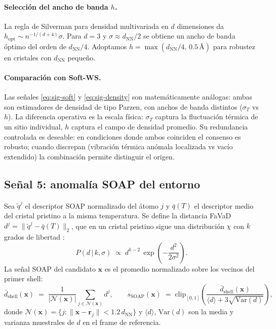 \documentclass[11pt,a4paper]{article}
\theoremstyle{remark}
\begin{document}
\paragraph{Selección del ancho de banda $h$.} La regla de Silverman
para densidad multivariada en $d$ dimensiones \cite{Silverman1986} da
$h_\text{opt} \sim n^{-1/(d+4)} \sigma$. Para $d=3$ y
$\sigma \approx d_\text{NN}/2$ se obtiene un ancho de banda óptimo del
orden de $d_\text{NN}/4$. Adoptamos
$h = \max(d_\text{NN}/4,\,0.5\,\text{Å})$ para robustez en cristales
con $d_\text{NN}$ pequeño.

\paragraph{Comparación con Soft-WS.} Las señales \ref{eq:sig-soft} y
\ref{eq:sig-density} son matemáticamente análogas: ambas son
estimadores de densidad de tipo Parzen, con anchos de banda distintos
($\sigma_T$ vs $h$). La diferencia operativa es la escala física:
$\sigma_T$ captura la fluctuación térmica de un sitio individual,
$h$ captura el campo de densidad promedio. Su redundancia controlada
es deseable: en condiciones donde ambos coinciden el consenso es
robusto; cuando discrepan (vibración térmica anómala localizada vs
vacío extendido) la combinación permite distinguir el origen.

\subsection{Señal 5: anomalía SOAP del entorno}
\label{sec:sig-soap}

Sea $\tilde q^j$ el descriptor SOAP normalizado del átomo $j$ y
$\bar q(T)$ el descriptor medio del cristal pristino a la misma
temperatura. Se define la distancia FaVaD
$d^j = \|\tilde q^j - \bar q(T)\|_2$, que en un cristal pristino sigue
una distribución $\chi$ con $k$ grados de libertad
\cite{Toussaint2020}:
\begin{equation}
  P(d \,|\, k,\sigma) \;\propto\; d^{k-2}\,
  \exp\!\left(-\frac{d^2}{2\sigma^2}\right).
\end{equation}
La señal SOAP del candidato $\mathbf{x}$ es el promedio normalizado
sobre los vecinos del primer shell:
\begin{equation}
  \bar d_\text{shell}(\mathbf{x}) \;=\;
  \frac{1}{|\mathcal{N}(\mathbf{x})|}
  \sum_{j \in \mathcal{N}(\mathbf{x})} d^j,
  \qquad
  s_\text{SOAP}(\mathbf{x}) \;=\; \mathrm{clip}_{[0,1]}\!\left(
  \frac{\bar d_\text{shell}(\mathbf{x})}{\langle d\rangle + 3\sqrt{\mathrm{Var}(d)}}\right),
  \label{eq:sig-soap}
\end{equation}
donde $\mathcal{N}(\mathbf{x}) = \{j : \|\mathbf{x} - \mathbf{r}_j\| <
1.2\,d_\text{NN}\}$ y $\langle d \rangle$, $\mathrm{Var}(d)$ son la
media y varianza muestrales de $d$ en el frame de referencia.
\end{document}
